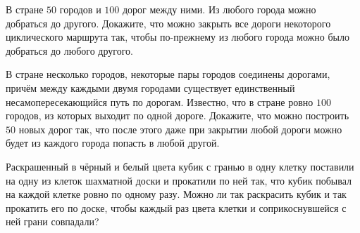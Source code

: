 \begin{problem}
	В стране $50$ городов и $100$ дорог между ними. Из любого города можно добраться до другого. Докажите, что можно закрыть все дороги некоторого циклического маршрута так, чтобы по-прежнему из любого города можно было добраться до любого другого.
\end{problem}

\begin{problem}
	В стране несколько городов, некоторые пары городов соединены дорогами, причём между каждыми двумя городами существует единственный несамопересекающийся путь по дорогам. Известно, что в стране ровно $100$ городов, из которых выходит по одной дороге. Докажите, что можно построить $50$ новых дорог так, что после этого даже при закрытии любой дороги можно будет из каждого города попасть в любой другой.
\end{problem}

\begin{problem}
	Раскрашенный в чёрный и белый цвета кубик с гранью в одну клетку поставили на одну из клеток шахматной доски и прокатили по ней так, что кубик побывал на каждой клетке ровно по одному разу. Можно ли так раскрасить кубик и так прокатить его по доске, чтобы каждый раз цвета клетки и соприкоснувшейся с ней грани совпадали?
\end{problem}

